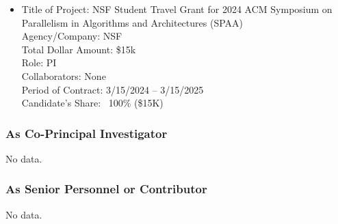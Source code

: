 \begin{adjustwidth}{2em}{0pt}
\begin{itemize}
    \item
    Title of Project: NSF Student Travel Grant for 2024 ACM Symposium on Parallelism in Algorithms and Architectures (SPAA)\\
    Agency/Company: NSF \\
    Total Dollar Amount: \$15k \\
    Role: PI \\
    Collaborators: None \\
    Period of Contract: 3/15/2024 – 3/15/2025 \\
    Candidate’s Share: ~100\% (\$15K)
\end{itemize}

\subsubsection{As Co-Principal Investigator}

No data.

\iffalse
\begin{itemize}
    \item
    Title of Project: \\
    Agency/Company: \\
    Total Dollar Amount:  \\
    Role: co-PI or PI \\
    Collaborators: Georgette Burdell (PI), Jane Doe (co-PI), John Doe (co-PI) \\
    Period of Contract: 7/1/2008 – 6/31/2010 \\
    Candidate’s Share: ~25\% (\$250K)
\end{itemize}
\fi

\subsubsection{As Senior Personnel or Contributor}

No data.

\iffalse
\begin{itemize}
    \item
    Title of Project: \\
    Agency/Company: \\
    Total Dollar Amount:  \\
    Role: co-PI or PI \\
    Collaborators: Georgette Burdell (PI), Jane Doe (co-PI), John Doe (co-PI) \\
    Period of Contract: 7/1/2008 – 6/31/2010 \\
    Candidate’s Share: ~25\% (\$250K)
\end{itemize}
\fi


\end{adjustwidth}
